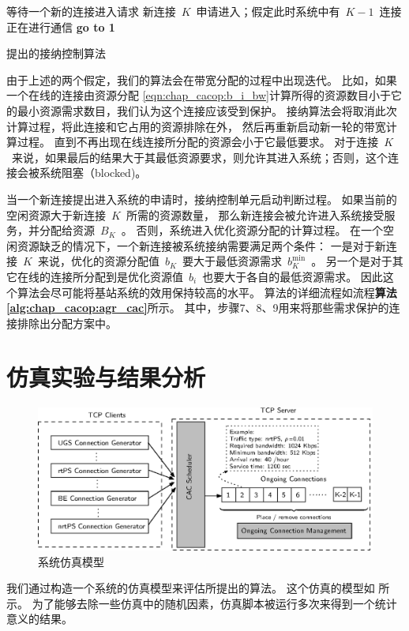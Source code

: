 \begin{algorithm}[H]
\SetAlgoLined
等待一个新的连接进入请求\;
新连接~$K$~申请进入；假定此时系统中有~$K-1$~连接正在进行通信\;
{\bf{go to 1}}\;
\caption{提出的接纳控制算法} \label{alg:chap_cacop:agr_cac}
\end{algorithm}


由于上述的两个假定，我们的算法会在带宽分配的过程中出现迭代。
比如，如果一个在线的连接由资源分配 \eqref{eqn:chap_cacop:b_i_bw}计算所得的资源数目小于它的最小资源需求数目，我们认为这个连接应该受到保护。
接纳算法会将取消此次计算过程，将此连接和它占用的资源排除在外，
然后再重新启动新一轮的带宽计算过程。
直到不再出现在线连接所分配的资源会小于它最低要求。
对于连接~$K$~来说，如果最后的结果大于其最低资源要求，则允许其进入系统；否则，这个连接会被系统阻塞（blocked)。


当一个新连接提出进入系统的申请时，接纳控制单元启动判断过程。
如果当前的空闲资源大于新连接~$K$~所需的资源数量，
那么新连接会被允许进入系统接受服务，并分配给资源~$B_K$~。
否则，系统进入优化资源分配的计算过程。
在一个空闲资源缺乏的情况下，一个新连接被系统接纳需要满足两个条件：
一是对于新连接~$K$~来说，优化的资源分配值~$b_K$~要大于最低资源需求~$b_K^{\min}$~。
另一个是对于其它在线的连接所分配到是优化资源值~$b_i$~也要大于各自的最低资源需求。
因此这个算法会尽可能将基站系统的效用保持较高的水平。
算法的详细流程如流程{\bf{算法 \ref{alg:chap_cacop:agr_cac}}}所示。
其中，步骤7、8、9用来将那些需求保护的连接排除出分配方案中。


\section{仿真实验与结果分析}
\begin{figure}[tb]
\centering
\includegraphics {cacop_simulator.eps}
\caption{系统仿真模型} 
\label{fig:chap_cacop:sim_cfg}
\end{figure}
我们通过构造一个系统的仿真模型来评估所提出的算法。
这个仿真的模型如 所示。
为了能够去除一些仿真中的随机因素，仿真脚本被运行多次来得到一个统计意义的结果。

